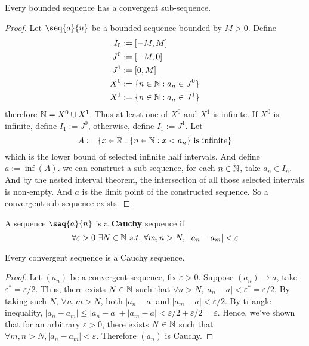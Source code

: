 \documentclass[11pt]{article}
\begin{document}
        \begin{theorem}
            Every bounded sequence has a convergent sub-sequence.
        \end{theorem}
        
        \begin{proof}
            Let $\seq{a}{n}$ be a bounded sequence bounded by $M > 0$. Define
            \begin{align}
                I_0 &:= [-M, M] \\
                J^0 &:= [-M, 0] \\
                J^1 &:= [0, M] \\
                X^0 &:= \{n \in \mathbb{N}: a_n \in J^0\} \\
                X^1 &:= \{n \in \mathbb{N}: a_n \in J^1\}
            \end{align}
            therefore $\mathbb{N} = X^0 \cup X^1$. Thus at least one of $X^0$ and $X^1$ is infinite. If $X^0$ is infinite, define $I_1 := J^0$, otherwise, define $I_1 := J^1$. Let 
            \begin{equation}
                A := \{x \in \mathbb{R}: \{n \in \mathbb{N}: x < a_n\} \text{{ is infinite}} \}
            \end{equation}
            which is the lower bound of selected infinite half intervals. And define $a:= \inf(A)$. we can construct a sub-sequence, for each $n \in \mathbb{N}$, take $a_n \in I_n$. And by the nested interval theorem, the intersection of all those selected intervals is non-empty. And $a$ is the limit point of the constructed sequence. So a convergent sub-sequence exists.
        \end{proof}
        
        \begin{definition}
            A sequence $\seq{a}{n}$ is a \textbf{Cauchy} sequence if 
            \begin{equation}
                \forall \varepsilon > 0\ \exists N \in \mathbb{N}\ s.t.\ \forall m, n > N,\ |a_n - a_m| < \varepsilon
            \end{equation}
        \end{definition}
        
        \begin{theorem}
            Every convergent sequence is a Cauchy sequence.
        \end{theorem}
        
        \begin{proof}
            Let $(a_n)$ be a convergent sequence, fix $\varepsilon > 0$. Suppose $(a_n) \to a$, take $\varepsilon^* = \varepsilon / 2$. Thus, there exists $N \in \mathbb{N}$ such that $\forall n > N, |a_n - a| < \varepsilon^* = \varepsilon / 2$. By taking such $N$, $\forall n, m > N$, both $|a_n - a|$ and $|a_m - a| < \varepsilon / 2$. By triangle inequality, $|a_n - a_m| \leq |a_n - a| + |a_m - a| < \varepsilon / 2 + \varepsilon / 2 = \varepsilon$. Hence, we've shown that for an arbitrary $\varepsilon > 0$, there exists $N \in \mathbb{N}$ such that $\forall m, n > N, |a_n - a_m| < \varepsilon$. Therefore $(a_n)$ is Cauchy.
        \end{proof}
        
\end{document}
